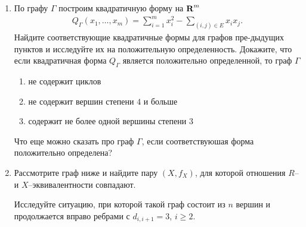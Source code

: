 \begin{enumerate}
\begin{enumerate}
\begin{center}
\end{center}
\end{enumerate}

\item По графу $\Gamma$ построим квадратичную форму на $\text{\bfseries R}^m$
\begin{align*}
Q_\Gamma(x_1, \ldots, x_m) = \sum_{i=1}^m x_i^2 - \sum_{(i,j)\in E} x_i x_j.
\end{align*}
Найдите соответствующие квадратичные формы для графов пре-\linebreak дыдущих пунктов и исследуйте их на положительную определенность. Докажите, что если квадратичная форма $Q_\Gamma$ является положительно определенной, то граф $\Gamma$
\begin{enumerate}
\item не содержит циклов
\item не содержит вершин степени $4$ и больше
\item содержит не более одной вершины степени $3$
\end{enumerate}
Что еще можно сказать про граф $\Gamma$, если соответствуюшая форма положительно определена?
\item Рассмотрите граф ниже и найдите пару $(X,f_X)$, для которой отношения $R$-- и $X$--эквивалентности совпадают.
\begin{center}
\end{center}
Исследуйте ситуацию, при которой такой граф состоит из $n$ вершин и продолжается вправо ребрами с $d_{i,i+1} = 3$, $i \geq 2$.
\end{enumerate}